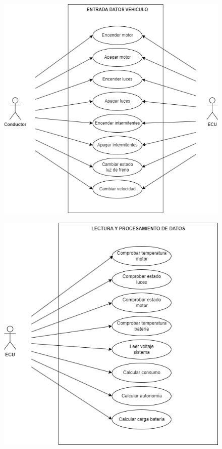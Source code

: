 \begin{figure}[H]
    \centering
    \includegraphics[width=1.1\textwidth]{imagenes/diagrama_CU_1.png}
\end{figure}

\begin{figure}[H]
    \centering
    \includegraphics[width=1\textwidth]{imagenes/diagrama_CU_2.png}
\end{figure}

